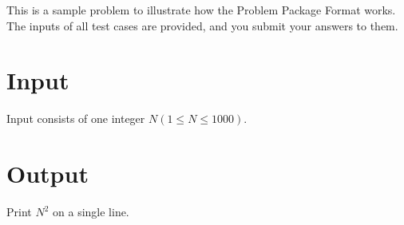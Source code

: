 This is a sample problem to illustrate how the Problem Package Format works.
The inputs of all test cases are provided, and you submit your answers to them.
\section*{Input}
Input consists of one integer $N (1 \le N \le 1000)$.
\section*{Output}
Print $N^2$ on a single line.
